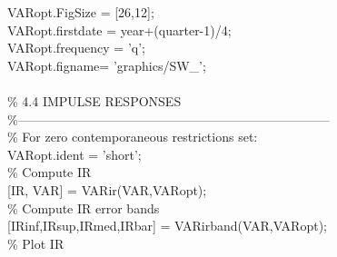 \hspace{1mm}\hspace{5mm} VARopt.FigSize = [26,12]; \\ 
\hspace{1mm}\hspace{5mm} VARopt.firstdate = year+(quarter-1)/4; \\ 
\hspace{1mm}\hspace{5mm} VARopt.frequency = \textcolor{matlabpurple}{'q'}; \\ 
\hspace{1mm}\hspace{5mm} VARopt.figname= \textcolor{matlabpurple}{'graphics/SW\_'}; \\ 
\hspace{1mm}\hspace{5mm}  \\ 
\hspace{1mm}\hspace{5mm} \textcolor{matlabgreen}{\% 4.4 IMPULSE RESPONSES }\\ 
\hspace{1mm}\hspace{5mm} \textcolor{matlabgreen}{\%--------------------------------------------------------------------------  }\\ 
\hspace{1mm}\hspace{5mm} \textcolor{matlabgreen}{\% For zero contemporaneous restrictions set: }\\ 
\hspace{1mm}\hspace{5mm} VARopt.ident = \textcolor{matlabpurple}{'short'}; \\ 
\hspace{1mm}\hspace{5mm} \textcolor{matlabgreen}{\% Compute IR }\\ 
\hspace{1mm}\hspace{5mm} [IR, VAR] = VARir(VAR,VARopt); \\ 
\hspace{1mm}\hspace{5mm} \textcolor{matlabgreen}{\% Compute IR error bands }\\ 
\hspace{1mm}\hspace{5mm} [IRinf,IRsup,IRmed,IRbar] = VARirband(VAR,VARopt); \\ 
\hspace{1mm}\hspace{5mm} \textcolor{matlabgreen}{\% Plot IR }\\ 
